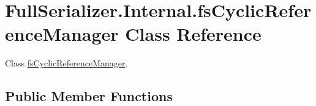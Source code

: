 \hypertarget{class_full_serializer_1_1_internal_1_1fs_cyclic_reference_manager}{}\section{Full\+Serializer.\+Internal.\+fs\+Cyclic\+Reference\+Manager Class Reference}
\label{class_full_serializer_1_1_internal_1_1fs_cyclic_reference_manager}


Class \hyperlink{class_full_serializer_1_1_internal_1_1fs_cyclic_reference_manager}{fs\+Cyclic\+Reference\+Manager}.  


\subsection*{Public Member Functions}
